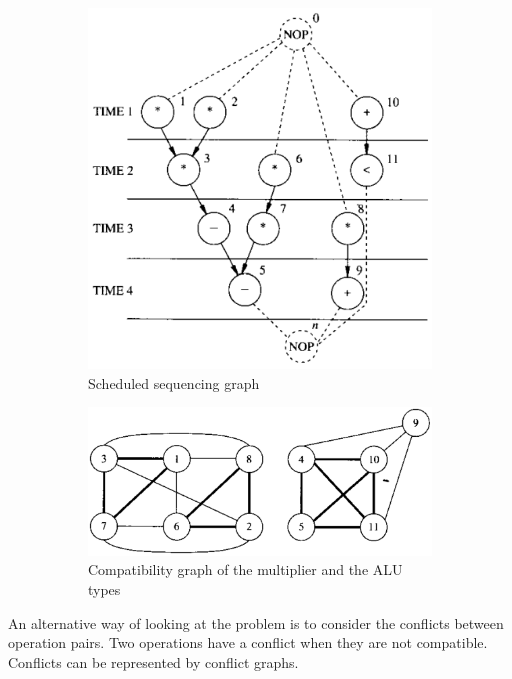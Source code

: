 \begin{figure}[H]
    \centering
    \begin{subfigure}[b]{0.45\textwidth}
        \includegraphics[width=\textwidth]{./Cap5/Images/Image01.png}
        \caption{Scheduled  sequencing  graph}
   		\label{fig:SchSeqG}
    \end{subfigure}
    \quad\quad\quad
    \begin{subfigure}[b]{0.45\textwidth}
        \includegraphics[width=\textwidth]{./Cap5/Images/Image02.png}
        \caption{Compatibility graph of the multiplier and the ALU types}
   		\label{fig:Compat}
    \end{subfigure}
    \caption{}
\end{figure}
An alternative way of looking at the problem is to consider the  conflicts  between operation pairs. Two operations have a conflict when they are not compatible. Conflicts can be represented by  conflict graphs.
